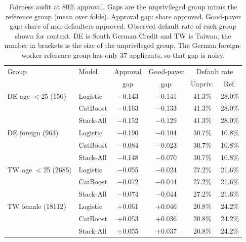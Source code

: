 \begin{table}[t]
\centering
\caption{Fairness audit at 80\% approval. Gaps are the unprivileged group minus the reference group (mean over folds). Approval gap: share approved. Good-payer gap: share of non-defaulters approved. Observed default rate of each group shown for context. DE is South German Credit and TW is Taiwan; the number in brackets is the size of the unprivileged group. The German foreign-worker reference group has only 37 applicants, so that gap is noisy.}
\label{tab:fair}
\small
\setlength{\tabcolsep}{1.5pt}
\begin{tabular}{@{}llcccc@{}}
\toprule
Group & Model & Approval & Good-payer & \multicolumn{2}{c}{Default rate}\\
 & & gap & gap & Unpriv. & Ref.\\
\midrule
DE age $<$25 (150) & Logistic & $-$0.143 & $-$0.141 & 41.3\% & 28.0\%\\
 & CatBoost & $-$0.163 & $-$0.133 & 41.3\% & 28.0\%\\
 & Stack-All & $-$0.152 & $-$0.129 & 41.3\% & 28.0\%\\
\midrule
DE foreign (963) & Logistic & $-$0.190 & $-$0.104 & 30.7\% & 10.8\%\\
 & CatBoost & $-$0.084 & $-$0.023 & 30.7\% & 10.8\%\\
 & Stack-All & $-$0.148 & $-$0.070 & 30.7\% & 10.8\%\\
\midrule
TW age $<$25 (2685) & Logistic & $-$0.055 & $-$0.024 & 27.2\% & 21.6\%\\
 & CatBoost & $-$0.072 & $-$0.044 & 27.2\% & 21.6\%\\
 & Stack-All & $-$0.074 & $-$0.044 & 27.2\% & 21.6\%\\
\midrule
TW female (18112) & Logistic & +0.061 & +0.046 & 20.8\% & 24.2\%\\
 & CatBoost & +0.053 & +0.036 & 20.8\% & 24.2\%\\
 & Stack-All & +0.055 & +0.037 & 20.8\% & 24.2\%\\
\bottomrule
\end{tabular}
\end{table}
